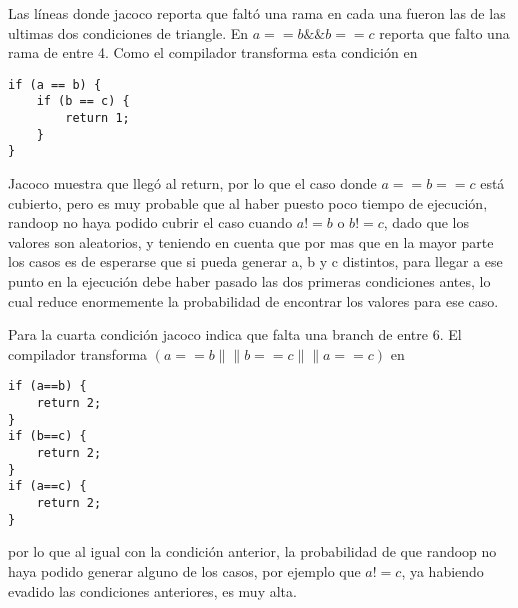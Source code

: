 Las líneas donde jacoco reporta que faltó una rama en cada una fueron las de las ultimas dos condiciones de triangle. En $a == b \&\& b == c$ reporta que falto una rama de entre 4. Como el compilador transforma esta condición en 

\newpage
\begin{verbatim}
if (a == b) {
	if (b == c) {
        return 1;
	}
}
\end{verbatim}

Jacoco muestra que llegó al return, por lo que el caso donde $a == b == c$ está cubierto, pero es muy probable que al haber puesto poco tiempo de ejecución, randoop no haya podido cubrir el caso cuando $a != b$ o $b != c$, dado que los valores son aleatorios, y teniendo en cuenta que por mas que en la mayor parte los casos es de esperarse que si pueda generar a, b y c distintos, para llegar a ese punto en la ejecución debe haber pasado las dos primeras condiciones antes, lo cual reduce enormemente la probabilidad de encontrar los valores para ese caso.

Para la cuarta condición jacoco indica que falta una branch de entre 6. El compilador transforma $(a==b \|\| b==c \|\| a==c)$ en 

\begin{verbatim}
if (a==b) {
	return 2;
}
if (b==c) {
	return 2;
}
if (a==c) {
	return 2;
}
\end{verbatim}

por lo que al igual con la condición anterior, la probabilidad de que randoop no haya podido generar alguno de los casos, por ejemplo que $a != c$, ya habiendo evadido las condiciones anteriores, es muy alta.

